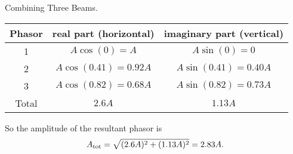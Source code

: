 \begin{example}{Combining Three Beams.}
\renewcommand{\arraystretch}{2.0}
\begin{center}
\begin{tabular}{|c|c|c|}\hline
\quad Phasor\quad &
\quad real part (horizontal) \quad &
\quad imaginary part (vertical) \quad \\ 
\hline\hline
1      & $A\cos\left(0\right) = A$ & $A\sin\left(0\right) = 0$ \\
\hline
2      & $A\cos\left(0.41\right)= 0.92A$ & $A\sin\left(0.41\right) = 0.40A$ \\
\hline
3      & $A\cos\left(0.82\right)=0.68A$ & $A\sin\left(0.82\right)=0.73A$ \\
\hline
\hline
Total  & $2.6A$   & $1.13A$ \\
\hline
\end{tabular}
\end{center}
\renewcommand{\arraystretch}{1.0}

So the amplitude of the resultant phasor is 
\begin{equation}
A_{\rm tot} = \sqrt{(2.6A)^2 + (1.13A)^2} = 2.83A.
\end{equation}

\end{example}

